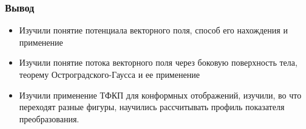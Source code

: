 \begin{frame}\frametitle{Вывод}
  \begin{itemize}
    \item Изучили понятие потенциала векторного поля,
      способ его нахождения и применение
    \item Изучили понятие потока векторного поля через боковую поверхность тела, теорему Остроградского-Гаусса и ее применение
    \item Изучили применение ТФКП для конформных отображений,
      изучили, во что переходят разные фигуры,
      научились рассчитывать профиль показателя преобразования.
  \end{itemize}
\end{frame}
